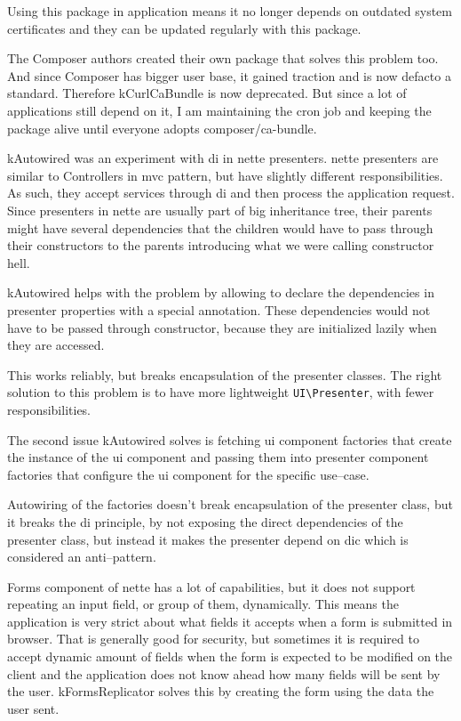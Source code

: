 Using this package in application means it no longer depends on outdated system certificates and they can be updated regularly with this package.

The Composer authors created their own package  that solves this problem too. And since Composer has bigger user base, it gained traction and is now defacto a standard. Therefore \gls{kCurlCaBundle} is now deprecated. But since a lot of applications still depend on it, I am maintaining the cron job and keeping the package alive until everyone adopts composer/ca-bundle.

 \label{sec:state:autowired}

\gls{kAutowired} was an experiment with \gls{di} in \gls{nette} presenters. \gls{nette} presenters are similar to Controllers in \gls{mvc} pattern, but have slightly different responsibilities. As such, they accept services through \gls{di} and then process the application request. Since presenters in \gls{nette} are usually part of big inheritance tree, their parents might have several dependencies that the children would have to pass through their constructors to the parents introducing what we were calling constructor hell.

\gls{kAutowired} helps with the problem by allowing to declare the dependencies in presenter properties with a special annotation. These dependencies would not have to be passed through constructor, because they are initialized lazily when they are accessed.

This works reliably, but breaks encapsulation of the presenter classes. The right solution to this problem is to have more lightweight \lstinline{UI\Presenter}, with fewer responsibilities.

The second issue \gls{kAutowired} solves is fetching \gls{ui} component factories that create the instance of the \gls{ui} component and passing them into presenter component factories that configure the \gls{ui} component for the specific use--case.

Autowiring of the factories doesn't break encapsulation of the presenter class, but it breaks the \gls{di} principle, by not exposing the direct dependencies of the presenter class, but instead it makes the presenter depend on \gls{dic} which is considered an anti--pattern.

 \label{sec:state:forms-replicator}

Forms component of \gls{nette} has a lot of capabilities, but it does not support repeating an input field, or group of them, dynamically. This means the application is very strict about what fields it accepts when a form is submitted in browser. That is generally good for security, but sometimes it is required to accept dynamic amount of fields when the form is expected to be modified on the client and the application does not know ahead how many fields will be sent by the user. \gls{kFormsReplicator} solves this by creating the form using the data the user sent.

